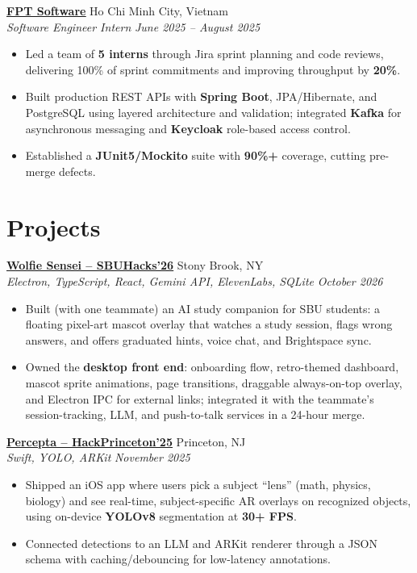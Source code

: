 \documentclass[letterpaper,10pt]{article}
\newcommand{\role}[4]{%
  \textbf{\underline{#1}} \hfill #2\\
  \textit{#3} \hfill \textit{#4}\vspace{-1pt}}
\begin{document}
\role{\href{https://fptsoftware.com}{FPT Software}}{Ho Chi Minh City, Vietnam}{Software Engineer Intern}{June 2025 -- August 2025}
\begin{itemize}
  \item Led a team of \textbf{5 interns} through Jira sprint planning and code reviews, delivering 100\% of sprint commitments and improving throughput by \textbf{20\%}.
  \item Built production REST APIs with \textbf{Spring Boot}, JPA/Hibernate, and PostgreSQL using layered architecture and validation; integrated \textbf{Kafka} for asynchronous messaging and \textbf{Keycloak} role-based access control.
  \item Established a \textbf{JUnit5/Mockito} suite with \textbf{90\%+} coverage, cutting pre-merge defects.
\end{itemize}

\section{Projects}
\role{\href{https://devpost.com/software/wolfie-sensei}{Wolfie Sensei -- SBUHacks'26}}{Stony Brook, NY}{Electron, TypeScript, React, Gemini API, ElevenLabs, SQLite}{October 2026}
\begin{itemize}
  \item Built (with one teammate) an AI study companion for SBU students: a floating pixel-art mascot overlay that watches a study session, flags wrong answers, and offers graduated hints, voice chat, and Brightspace sync.
  \item Owned the \textbf{desktop front end}: onboarding flow, retro-themed dashboard, mascot sprite animations, page transitions, draggable always-on-top overlay, and Electron IPC for external links; integrated it with the teammate's session-tracking, LLM, and push-to-talk services in a 24-hour merge.
\end{itemize}

\role{\href{https://devpost.com/software/percepta-4jfs8b}{Percepta -- HackPrinceton'25}}{Princeton, NJ}{Swift, YOLO, ARKit}{November 2025}
\begin{itemize}
  \item Shipped an iOS app where users pick a subject ``lens'' (math, physics, biology) and see real-time, subject-specific AR overlays on recognized objects, using on-device \textbf{YOLOv8} segmentation at \textbf{30+ FPS}.
  \item Connected detections to an LLM and ARKit renderer through a JSON schema with caching/debouncing for low-latency annotations.
\end{itemize}
\end{document}
